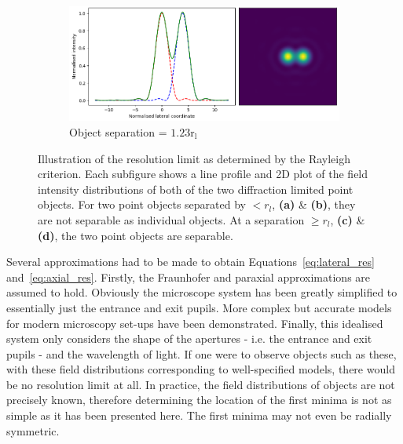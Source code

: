 \begin{figure}[h]
\begin{subfigure}{0.49\textwidth}
		\label{fig:Airy_ring_2_object_seperation_1_22}
	\end{subfigure}
	\begin{subfigure}{0.49\textwidth}
		\centering
		\includegraphics[width=\linewidth]{images/Airy_ring_2_object_seperation_1_5.png}
		\caption{Object separation = $1.23\text{r}_{\text{l}}$}
		\label{fig:Airy_ring_2_object_seperation_1_5}
	\end{subfigure}
	\caption[Illustration of the resolution limit as determined by the Rayleigh
	criterion]{Illustration of the resolution limit as determined by the Rayleigh 
		criterion. Each subfigure shows a line profile and 2D plot of the field 
		intensity distributions of both of the two diffraction limited point 
		objects. For two point objects separated by $< r_{l}$, \textbf{(a)} \& 
		\textbf{(b)}, they are not separable as individual objects. At a 
		separation $\ge r_{l}$, \textbf{(c)} \& \textbf{(d)}, the two point 
		objects are separable.}
	\label{fig:Airy_ring_2_object_seperation}
\end{figure}

Several approximations had to be made to obtain Equations~\ref{eq:lateral_res}
and~\ref{eq:axial_res}. Firstly, the Fraunhofer and paraxial approximations are
assumed to hold\cite{goodman2005introduction}. Obviously the microscope system
has been greatly simplified to essentially just the entrance and exit pupils. 
More complex but accurate models for modern microscopy set-ups have been 
demonstrated\cite{torok2007optical, foreman2011computational}. Finally, this
idealised system only considers the shape of the apertures - i.e. the entrance
and exit pupils - and the wavelength of light. If one were to observe objects 
such as these, with these field distributions corresponding to well-specified
models, there would be no resolution limit at all\cite{den1997resolution}. In 
practice, the field distributions of objects are not precisely known, therefore
determining the location of the first minima is not as simple as it has been 
presented here. The first minima may not even be radially symmetric. 

